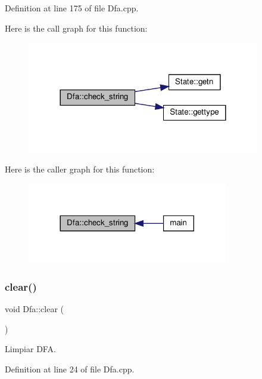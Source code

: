 Definition at line 175 of file Dfa.\+cpp.

Here is the call graph for this function\+:
\nopagebreak
\begin{figure}[H]
\begin{center}
\leavevmode
\includegraphics[width=288pt]{class_dfa_a0dd99d06e33e16c8fd342af4dbba3551_cgraph}
\end{center}
\end{figure}
Here is the caller graph for this function\+:
\nopagebreak
\begin{figure}[H]
\begin{center}
\leavevmode
\includegraphics[width=248pt]{class_dfa_a0dd99d06e33e16c8fd342af4dbba3551_icgraph}
\end{center}
\end{figure}
\mbox{\label{class_dfa_ae04b47677350573031c492799a1c897b}} 
\subsubsection{\texorpdfstring{clear()}{clear()}}
{\footnotesize\ttfamily void Dfa\+::clear (\begin{DoxyParamCaption}{ }\end{DoxyParamCaption})}



Limpiar D\+FA. 



Definition at line 24 of file Dfa.\+cpp.

